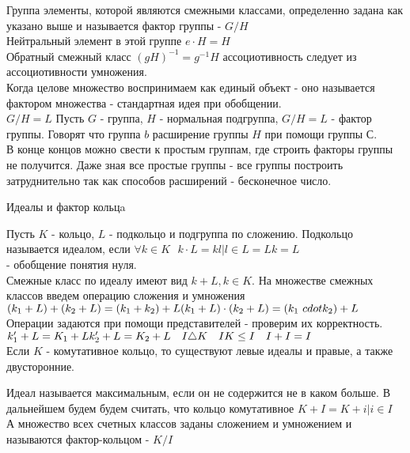 \begin{defin}
	Группа элементы, которой являются смежными классами, определенно задана как
	указано выше и называется фактор группы - $G/H$\\
	Нейтральный элемент в этой группе $e \cdot H = H$\\
	Обратный смежный класс $(gH)^{-1} = g^{-1}H$ ассоциотивность следует из
	ассоциотивности умножения.\\
	Когда целове множество воспринимаем как единый объект - оно называется
	фактором множества - стандартная идея при обобщении.\\
	$G/H = L$ Пусть $G$ - группа, $H$ - нормальная подгруппа, $G/H = L$ - фактор
	группы. Говорят что группа $b$ расширение группы $H$ при помощи группы С.\\
	В конце концов можно свести к простым группам, где строить факторы группы не
	получится. Даже зная все простые группы - все группы построить затруднительно
	так как способов расширений - бесконечное число.
\end{defin}

\begin{title}
	Идеалы и фактор кольцa
\end{title}

Пусть $K$ - кольцо, $L$ - подкольцо и подгруппа по сложению. Подкольцо
называется идеалом, если $\forall k \in K ~~~ k \cdot L = {kl | l \in L} =
Lk = L$\\
 - обобщение понятия нуля.\\
Смежные класс по идеалу имеют вид $k + L, k \in K$. На множестве смежных классов
введем операцию сложения и умножения\\
$(k_1 + L) + (k_2 + L) = (k_1 + k_2) + L\\
(k_1 + L) \cdot (k_2 + L) = (k_1 \ cdot k_2) + L$\\
Операции задаются при помощи представителей - проверим их корректность.\\
$k'_1 + L = K_1 + L\\
k'_2 + L = K_2 + L ~~~ I \triangle K ~~~ IK \le I ~~~ I + I = I$\\
Если $K$ - комутативное кольцо, то существуют левые идеалы и правые, а также
двусторонние.\\

\begin{defin}
	Идеал называется максимальным, если он не содержится не в каком больше.
	В дальнейшем будем будем считать, что кольцо комутативное $K + I = {K + i
	| i \in I}$\\
	А множество всех счетных классов заданы сложением и умножением и называются
	фактор-кольцом - $K/I$\\

\end{defin}

